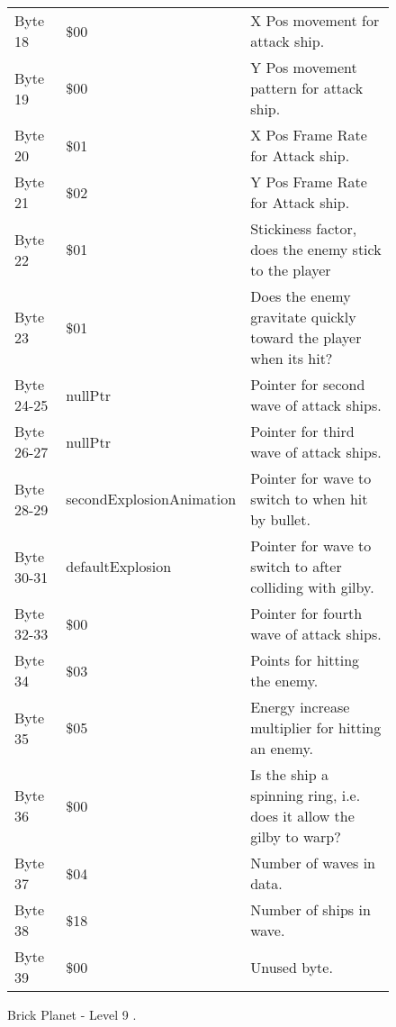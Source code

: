 \begin{figure}[H]
{\begin{adjustbox}{width=12cm}
\begin{tabular}{lll}
 Byte 18    & \$00                       & X Pos movement for attack ship.                                     \\
 Byte 19    & \$00                       & Y Pos movement pattern for attack ship.                             \\
 Byte 20    & \$01                       & X Pos Frame Rate for Attack ship.                                   \\
 Byte 21    & \$02                       & Y Pos Frame Rate for Attack ship.                                   \\
 Byte 22    & \$01                       & Stickiness factor, does the enemy stick to the player               \\
 Byte 23    & \$01                       & Does the enemy gravitate quickly toward the player when its hit?    \\
 Byte 24-25 & nullPtr                   & Pointer for second wave of attack ships.                            \\
 Byte 26-27 & nullPtr                   & Pointer for third wave of attack ships.                             \\
 Byte 28-29 & secondExplosionAnimation  & Pointer for wave to switch to when hit by bullet.                   \\
 Byte 30-31 & defaultExplosion          & Pointer for  wave to switch to after colliding with gilby.          \\
 Byte 32-33 & \$00                       & Pointer for fourth wave of attack ships.                            \\
 Byte 34    & \$03                       & Points for hitting the enemy.                                       \\
 Byte 35    & \$05                       & Energy increase multiplier for hitting an enemy.                    \\
 Byte 36    & \$00                       & Is the ship a spinning ring, i.e. does it allow the gilby to warp?  \\
 Byte 37    & \$04                       & Number of waves in data.                                            \\
 Byte 38    & \$18                       & Number of ships in wave.                                            \\
 Byte 39    & \$00                       & Unused byte.                                                        \\
\bottomrule
\end{tabular}

  \end{adjustbox}

  }\caption*{Brick Planet - Level 9
.}
\end{figure}

